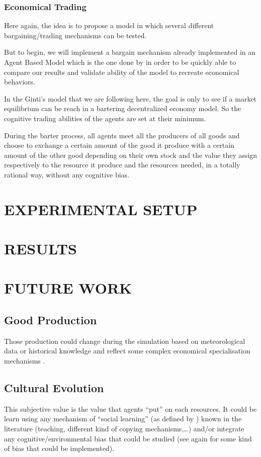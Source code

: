 \documentclass{wscpaperproc}
\begin{document}
\subsubsection{Economical Trading}\label{trade}
Here again, the idea is to propose a model in which several different bargaining/trading mechanisms can be tested. 

But to begin, we will implement a bargain mechanism already implemented in an Agent Based Model which is the one done by
\cite{gintis_emergence_2006} in order to be quickly able to compare our results and validate ability of the model to recreate economical behaviors. 

In the Ginti's model that we are following here, the goal is only to see if a market equilibrium can be reach in a bartering decentralized economy model. So the cognitive trading abilities of the agents are set at their minimum. 

During the barter process, all agents meet all the producers of all goods and choose to exchange a certain amount of the good it produce with a certain amount of the other good depending on their own stock and the value they assign respectively to the resource it produce and the resources needed, in a totally rational way, without any cognitive bias.

\section{EXPERIMENTAL SETUP}

\section{RESULTS}

\section{FUTURE WORK}
\subsection{Good Production}
Those production could change during the simulation based on meteorological data or historical knowledge and reflect some complex economical specialisation mechanisms \cite{bentley_specialisation_2005}.


\subsection{Cultural Evolution}
This subjective value is the value that agents ``put'' on each resources. It could be learn using any mechanism of ``social learning'' (as defined by \cite{lycett_cultural_2015}) known in the literature (teaching, different kind of copying mechanisms,\ldots) and/or integrate any cognitive/environmental bias that could be studied (see again \cite{lycett_cultural_2015} for some kind of bias that could be implemented).
\end{document}
